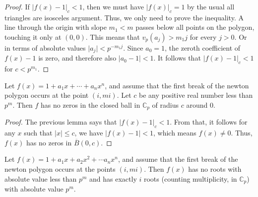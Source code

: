 \begin{proof}
  If $\lvert f(x) - 1 \rvert_c < 1$, then we must have $\lvert f (x) \rvert_c = 1$ by the usual all
  triangles are isosceles argument. Thus, we only need to prove the inequality.
  A line through the origin with slope $m_1 < m$ passes below all points on the polygon, touching it
  only at $(0,0)$. This means that $v_p(a_j) > m_1 j$ for every $j > 0$. Or in terms of absolute
  values $\lvert a_j \rvert < p^{-m_1 j}.$ Since $a_0 = 1$, the zeroth coefficient of $f(x) - 1$ is
  zero, and therefore also $\lvert a_0 - 1 \rvert < 1.$ It follows that $\lvert f(x) - 1 \rvert_c < 1$
  for $c < p^{m_1}$.
\end{proof}

\begin{lemma}
  Let $f(x) = 1 + a_1 x + \cdots + a_n x^n$, and assume that the first break of the newton polygon
  occurs at the point $(i,mi)$. Let $c$ be any positive real number less than $p^m$. Then $f$ has no
  zeros in the closed ball in $\mathbb{C}_p$ of radius $c$ around 0.
\end{lemma}

\begin{proof}
  The previous lemma says that $\lvert f(x) - 1 \rvert_c < 1$. From that, it follows for any $x$ such
  that $\lvert x \rvert \leq c$, we have $\lvert f(x) - 1 \rvert < 1$, which means $f(x) \neq 0$.
  Thus, $f(x)$ has no zeros in $\overline{B}(0,c)$.
\end{proof}



\begin{proposition}
  Let $f(x) = 1 + a_1 x + a_2 x^2 + \cdots a_n x^n$, and assume that the first break of the newton
  polygon occurs at the points $(i,mi)$. Then $f(x)$ has no roots with absolute value less than $p^m$
  and has exactly $i$ roots (counting multiplicity, in $\mathbb{C}_p$) with absolute value $p^m$.
\end{proposition}

